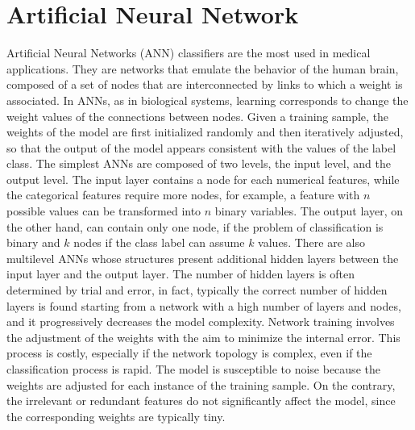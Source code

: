 \documentclass[final,a4paper,12pt,english]{UnicaPhdThesis3}
\begin{document}
\section{Artificial Neural Network} \label{ANN}
Artificial Neural Networks (\acs{ANN}) classifiers are the most used in medical applications. They are networks that emulate the behavior of the human brain, composed of a set of nodes that are interconnected by links to which a weight is associated. In ANNs, as in biological systems, learning corresponds to change the weight values of the connections between nodes. Given a training sample, the weights of the model are first initialized randomly and then iteratively adjusted, so that the output of the model appears consistent with the values of the label class. The simplest ANNs are composed of two levels, the input level, and the output level. The input layer contains a node for each numerical features, while the categorical features require more nodes, for example, a feature with $n$ possible values can be transformed into $n$ binary variables. The output layer, on the other hand, can contain only one node, if the problem of classification is binary and $k$ nodes if the class label can assume $k$ values. There are also multilevel ANNs whose structures present additional hidden layers between the input layer and the output layer. The number of hidden layers is often determined by trial and error, in fact, typically the correct number of hidden layers is found starting from a network with a high number of layers and nodes, and it progressively decreases the model complexity. Network training involves the adjustment of the weights with the aim to minimize the internal error. This process is costly, especially if the network topology is complex, even if the classification process is rapid. The model is susceptible to noise because the weights are adjusted for each instance of the training sample. On the contrary, the irrelevant or redundant features do not significantly affect the model, since the corresponding weights are typically tiny.
\end{document}

